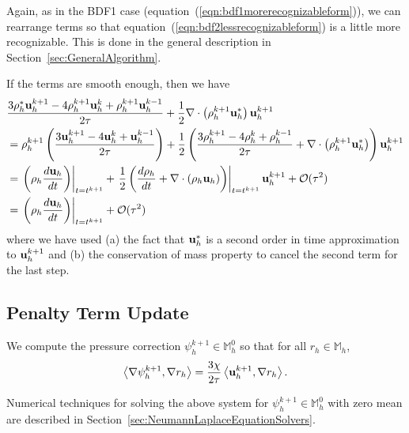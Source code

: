 \documentclass[letterpaper]{erdc}
\begin{document}
\begin{remark}
Again, as in the BDF1 case (equation~(\ref{eqn:bdf1morerecognizableform})), we can rearrange terms so that equation~(\ref{eqn:bdf2lessrecognizableform}) is a little more recognizable.  This is done in the general description in Section~\ref{sec:GeneralAlgorithm}.
\end{remark}

\begin{remark}
If the terms are smooth enough, then we have
\begin{align}
  &\frac{3\rho_h^{*}\textbf{u}_h^{k+1}-4\rho_h^{k+1}\textbf{u}_h^{k} +\rho_h^{k+1}\textbf{u}_h^{k-1}}{2\tau} +\frac{1}{2}\nabla\cdot\left(\rho_h^{k+1}\textbf{u}_h^{*}\right)\textbf{u}_h^{k+1}\\
   &= \rho_h^{k+1}\left(\frac{3\textbf{u}_h^{k+1} - 4\textbf{u}_h^{k} + \textbf{u}_h^{k-1}}{2\tau}\right) + \frac{1}{2} \left( \frac{3\rho_h^{k+1} -4\rho_h^{k} + \rho_h^{k-1}}{2\tau} + \nabla\cdot\left(\rho_h^{k+1}\textbf{u}_h^{*}\right)\right)\textbf{u}_h^{k+1}\\
  &= \left.\left(\rho_h\frac{d\textbf{u}_h}{dt} \right)\right|_{t=t^{k+1}} + \left.\frac{1}{2} \left( \frac{d\rho_h}{dt} +\nabla\cdot\left(\rho_h\textbf{u}_h\right)\right)\right|_{t=t^{k+1}}\textbf{u}_h^{k+1} + \mathcal{O}(\tau^2)\\
  &=\left.\left(\rho_h\frac{d\textbf{u}_h}{dt} \right)\right|_{t=t^{k+1}} + \mathcal{O}(\tau^{2})
\end{align}
where we have used (a) the fact that $\textbf{u}_h^{*}$ is a second order in time approximation to $\textbf{u}_h^{k+1}$ and (b) the conservation of mass property to cancel the second term for the last step.
\end{remark}




%
%
\subsection{Penalty Term Update}
We compute the pressure correction $\psi_h^{k+1}\in \mathbb{M}_h^0$ so that for all $r_h\in \mathbb{M}_h$,
\begin{equation}
  \left\langle \nabla\psi_h^{k+1}, \nabla r_h \right\rangle = \frac{3\chi}{2\tau}\left\langle \textbf{u}_h^{k+1}, \nabla r_h \right\rangle.
\end{equation}

\begin{remark}
  Numerical techniques for solving the above system for $\psi_h^{k+1}\in \mathbb{M}_h^0$ with zero mean are described in Section~\ref{sec:NeumannLaplaceEquationSolvers}.
\end{remark}
\end{document}
